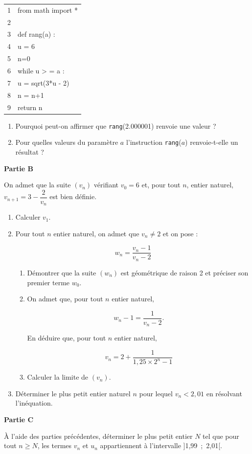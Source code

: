 \documentclass[10pt]{article}
\begin{document}
\begin{enumerate}
\begin{center}
\begin{ttfamily}
\begin{tabular}{>{\cellcolor{lightgray!50}}c l}
1&from math import *\\
2&\\
3&def rang(a) :\\
4&\quad  u = 6\\
5&\quad n=0\\
6& \quad while u > = a :\\
7&\qquad u = sqrt(3*u - 2)\\
8&\qquad n = n+1\\
9& \quad return n\\
\end{tabular}
\end{ttfamily}
\end{center}

	\begin{enumerate}
		\item Pourquoi peut-on affirmer que \texttt{rang}(2.000001) renvoie une valeur ?
		\item Pour quelles valeurs du paramètre $a$ l'instruction \texttt{rang}($a$) renvoie-t-elle un résultat ?
	\end{enumerate}
\end{enumerate}

\bigskip

\textbf{Partie B}

\medskip

On admet que la suite $\left(v_n\right)$ vérifiant $v_0 = 6$ et, pour tout $n$, entier naturel, $v_{n+1} = 3 - \dfrac{2}{v_n}$ est bien définie.

\medskip

\begin{enumerate}
\item Calculer $v_1$.
\item Pour tout $n$ entier naturel, on admet que $v_n \ne 2$ et on pose :

\[w_n = \dfrac{v_n - 1}{v_n - 2}\]

	\begin{enumerate}
		\item Démontrer que la suite $\left(w_n\right)$ est géométrique de raison 2 et préciser son premier terme $w_0$.
		\item On admet que, pour tout $n$ entier naturel,

\[w_n - 1 = \dfrac{1}{v_n - 2}.\]

En déduire que, pour tout $n$ entier naturel,

\[v_n = 2 + \dfrac{1}{1,25 \times 2^n - 1}\]

		\item Calculer la limite de $\left(v_n\right)$.
	\end{enumerate}
\item Déterminer le plus petit entier naturel $n$ pour lequel $v_n < 2,01$ en résolvant
l'inéquation.
\end{enumerate}

\bigskip

\textbf{Partie C}

\medskip

À l'aide des parties précédentes, déterminer le plus petit entier $N$ tel que pour tout $n \geqslant N$, les termes $v_n$ et $u_n$ appartiennent à l'intervalle ]1,99~;~2,01[.

\bigskip
\end{document}
